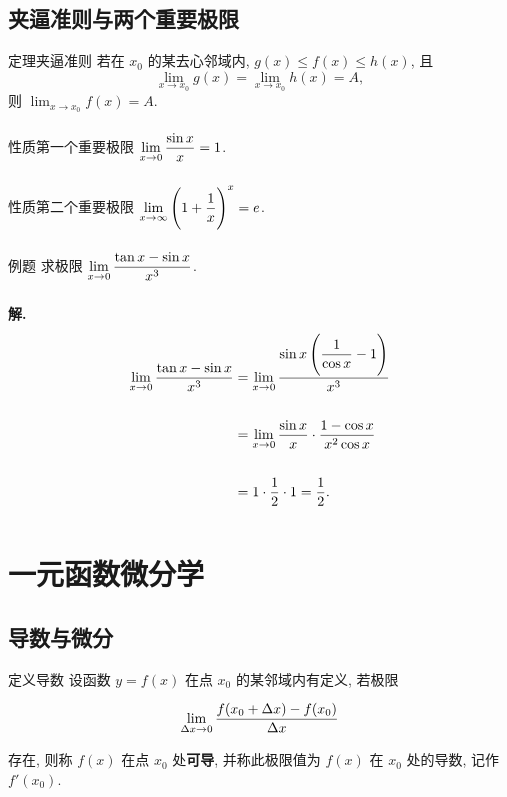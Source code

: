 \documentclass[a4paper,12pt,oneside,fontset=none]{ctexbook}
\renewcommand{\le}{\leqslant}
\let\olddfrac\dfrac
\renewcommand{\dfrac}[2]{
    \olddfrac{#1\vrule width 0pt height 1.15em depth 0em}{#2\vrule width 0pt height 0em depth 0.6em}
}
\let\oldlim\lim
\renewcommand{\lim}{\displaystyle\oldlim}
\newcounter{theorem}[chapter]
\newenvironment{theorem}[1][]{\begin{thmBox}{定理}{#1}}{\end{thmBox}}
\newenvironment{property}[1][]{\begin{thmBox}{性质}{#1}}{\end{thmBox}}
\newcounter{definition}[chapter]
\newenvironment{definition}[1][]{\begin{defBox}{定义}{#1}}{\end{defBox}}
\newcounter{example}[chapter]
\newenvironment{example}[1][]{\begin{exBox}{例题}{#1}}{\end{exBox}}
\numberwithin{equation}{chapter}
\begin{document}
\section{夹逼准则与两个重要极限}

\begin{theorem}[夹逼准则]
若在 $x_0$ 的某去心邻域内, $g(x) \le f(x) \le h(x)$, 且
\[
    \lim_{x \to x_0} g(x) = \lim_{x \to x_0} h(x) = A,
\]
则 $\lim_{x \to x_0} f(x) = A$.
\end{theorem}

\begin{property}[第一个重要极限]
$\lim_{x \to 0} \dfrac{\sin x}{x} = 1$.
\end{property}

\begin{property}[第二个重要极限]
$\lim_{x \to \infty}\left(1 + \dfrac{1}{x}\right)^{x} = e$.
\end{property}

\begin{example}
求极限 $\lim_{x \to 0} \dfrac{\tan x - \sin x}{x^3}$.
\end{example}

\textbf{解.}
\begin{align*}
    \lim_{x \to 0} \dfrac{\tan x - \sin x}{x^3}
    &= \lim_{x \to 0} \dfrac{\sin x\left(\dfrac{1}{\cos x} - 1\right)}{x^3} \\[6pt]
    &= \lim_{x \to 0} \dfrac{\sin x}{x} \cdot \dfrac{1 - \cos x}{x^2 \cos x} \\[6pt]
    &= 1 \cdot \dfrac{1}{2} \cdot 1 = \dfrac{1}{2}.
\end{align*}

\chapter{一元函数微分学}

\section{导数与微分}

\begin{definition}[导数]
设函数 $y = f(x)$ 在点 $x_0$ 的某邻域内有定义, 若极限
\[
    \lim_{\Delta x \to 0} \dfrac{f(x_0 + \Delta x) - f(x_0)}{\Delta x}
\]
存在, 则称 $f(x)$ 在点 $x_0$ 处\textbf{可导}, 并称此极限值为 $f(x)$ 在 $x_0$ 处的导数, 记作 $f'(x_0)$.
\end{definition}
\end{document}

